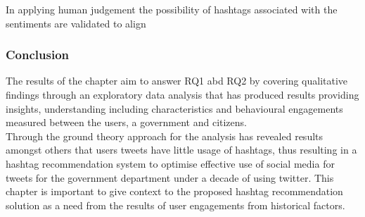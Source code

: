 In applying human judgement the possibility of hashtags associated with the sentiments are validated to align\\ 

\subsubsection{Conclusion}

The results of the chapter aim to answer RQ1 abd RQ2 by covering qualitative findings through an exploratory data analysis that has produced results providing insights, understanding including characteristics and behavioural engagements measured between the users, a government and  citizens.\\  Through the ground theory approach for the analysis has revealed results amongst others that users tweets have little usage of hashtags, thus resulting in a hashtag recommendation system to optimise effective use of social media for tweets for the government department under a decade of using twitter.  This chapter is important to give context to the proposed hashtag recommendation solution as a need from the results of user engagements from historical factors.  

